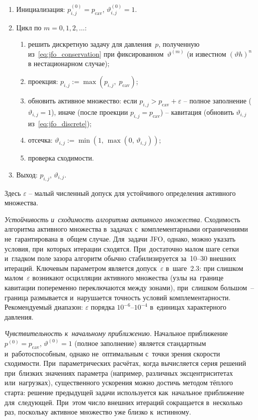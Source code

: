 \begin{enumerate}
  \item Инициализация: $p^{(0)}_{i,j} = p_{\mathrm{cav}}$,
        $\vartheta^{(0)}_{i,j} = 1$.
  \item Цикл по $m = 0, 1, 2, \ldots$:
    \begin{enumerate}
      \item[2.1)] решить дискретную задачу для давления~$p$,
            полученную из~\eqref{eq:jfo_conservation}
            при фиксированном~$\vartheta^{(m)}$
            (и известном $(\vartheta h)^n$ в нестационарном случае);
      \item[2.2)] проекция:
            $p_{i,j} := \max(p_{i,j},\; p_{\mathrm{cav}})$;
      \item[2.3)] обновить активное множество: если
            $p_{i,j} > p_{\mathrm{cav}} + \varepsilon$ --
            полное заполнение ($\vartheta_{i,j} = 1$),
            иначе (после проекции
            $p_{i,j} = p_{\mathrm{cav}}$) -- кавитация
            (обновить $\vartheta_{i,j}$
            из~\eqref{eq:jfo_discrete});
      \item[2.4)] отсечка:
            $\vartheta_{i,j} := \min(1,\,\max(0,\,\vartheta_{i,j}))$;
      \item[2.5)] проверка сходимости.
    \end{enumerate}
  \item Выход: $p_{i,j}$, $\vartheta_{i,j}$.
\end{enumerate}
Здесь $\varepsilon$ -- малый численный допуск для устойчивого
определения активного множества.

\textit{Устойчивость и~сходимость алгоритма активного множества.}
Сходимость алгоритма активного множества в~задачах с~комплементарными ограничениями не~гарантирована в~общем случае. Для~задачи JFO, однако, можно указать условия, при~которых итерации сходятся. При~достаточно малом шаге сетки и~гладком поле зазора алгоритм обычно стабилизируется за~10--30 внешних итераций. Ключевым параметром является допуск~$\varepsilon$ в~шаге~2.3: при слишком малом~$\varepsilon$ возникают осцилляции активного множества (узлы на~границе кавитации попеременно переключаются между зонами), при~слишком большом~-- граница размывается и~нарушается точность условий комплементарности. Рекомендуемый диапазон: $\varepsilon$ порядка $10^{-6}$--$10^{-4}$ в~единицах характерного давления.

\textit{Чувствительность к~начальному приближению.}
Начальное приближение $p^{(0)} = p_{\mathrm{cav}}$, $\vartheta^{(0)} = 1$ (полное заполнение) является стандартным и~работоспособным, однако не~оптимальным с~точки зрения скорости сходимости. При~параметрических расчётах, когда вычисляется серия решений при~близких значениях параметра (например, различных эксцентриситетах или~нагрузках), существенного ускорения можно достичь методом тёплого старта: решение предыдущей задачи используется как~начальное приближение для~следующей. При~этом число внешних итераций сокращается в~несколько раз, поскольку активное множество уже близко к~истинному.


